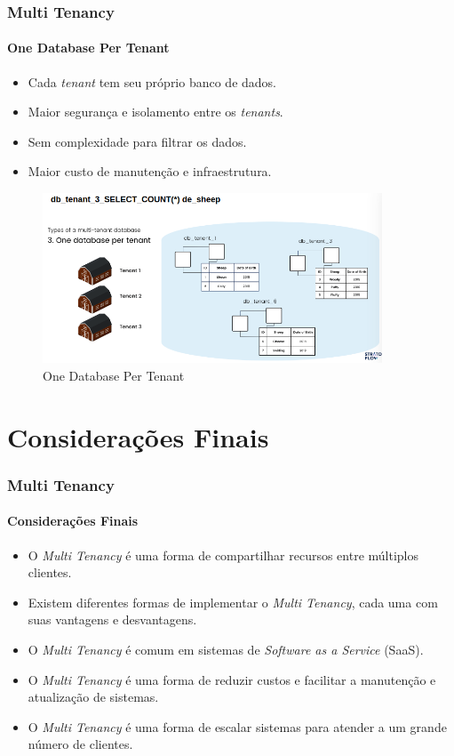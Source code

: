 \documentclass[
	9pt, %
	t, %
]{beamer}
\begin{document}
\begin{frame}
	\frametitle{Multi Tenancy}
	\framesubtitle{One Database Per Tenant}

	\begin{itemize}
		\item Cada \textit{tenant} tem seu próprio banco de dados.
		\item Maior segurança e isolamento entre os \textit{tenants}.
		\item Sem complexidade para filtrar os dados.
		\item \alert{Maior custo de manutenção e infraestrutura.}
	\end{itemize}

	\begin{figure}
		\centering
		\includegraphics[width=0.9\textwidth]{one_per_database.png}
		\caption{One Database Per Tenant}
	\end{figure}

\end{frame}

\section{Considerações Finais}

\begin{frame}
	\frametitle{Multi Tenancy}
	\framesubtitle{Considerações Finais}

	\begin{itemize}
		\item O \textit{Multi Tenancy} é uma forma de compartilhar recursos entre múltiplos clientes.
		\item Existem diferentes formas de implementar o \textit{Multi Tenancy}, cada uma com suas vantagens e desvantagens.
		\item O \textit{Multi Tenancy} é comum em sistemas de \textit{Software as a Service} (SaaS).
		\item O \textit{Multi Tenancy} é uma forma de reduzir custos e facilitar a manutenção e atualização de sistemas.
		\item O \textit{Multi Tenancy} é uma forma de escalar sistemas para atender a um grande número de clientes.
	\end{itemize}

\end{frame}
\end{document}
